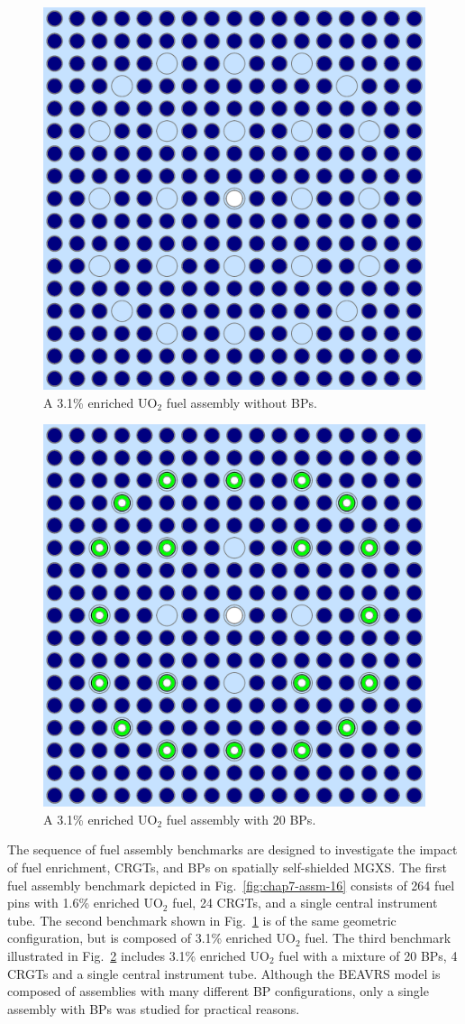 \begin{figure}[h!]
  \centering
  \includegraphics[width=0.65\linewidth]{figures/benchmarks/assembly-31}
\vspace{2mm}
\caption[BEAVRS 3.1\% enriched assembly]{A 3.1\% enriched UO$_2$ fuel assembly without \acp{BP}.}
\label{fig:chap7-assm-31}
\end{figure}

\begin{figure}[h!]
  \centering
  \includegraphics[width=0.65\linewidth]{figures/benchmarks/assembly-31-20BPs}
\vspace{2mm}
\caption[BEAVRS 3.1\% enriched assembly with 20 BPs]{A 3.1\% enriched UO$_2$ fuel assembly with 20 \acp{BP}.}
\label{fig:chap7-assm-31-20BPs}
\end{figure}

The sequence of fuel assembly benchmarks are designed to investigate the impact of fuel enrichment, \acp{CRGT}, and \acp{BP} on spatially self-shielded \ac{MGXS}. The first fuel assembly benchmark depicted in Fig.~\ref{fig:chap7-assm-16} consists of 264 fuel pins with 1.6\% enriched UO$_2$ fuel, 24 \acp{CRGT}, and a single central instrument tube. The second benchmark shown in Fig.~\ref{fig:chap7-assm-31} is of the same geometric configuration, but is composed of 3.1\% enriched UO$_2$ fuel. The third benchmark illustrated in Fig.~\ref{fig:chap7-assm-31-20BPs} includes 3.1\% enriched UO$_2$ fuel with a mixture of 20 \acp{BP}, 4 \acp{CRGT} and a single central instrument tube. Although the \ac{BEAVRS} model is composed of assemblies with many different \ac{BP} configurations, only a single assembly with \acp{BP} was studied for practical reasons.

